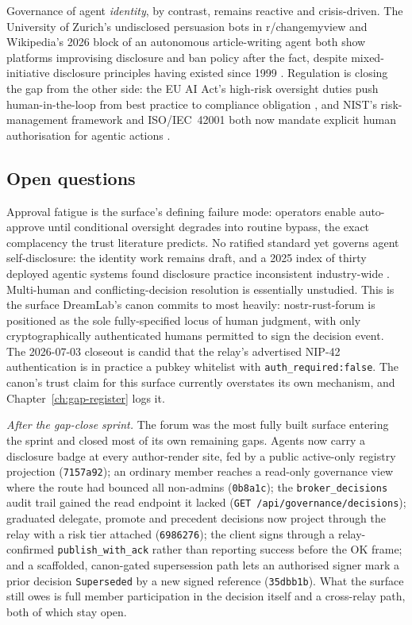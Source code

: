 Governance of agent \emph{identity}, by contrast, remains reactive and crisis-driven. The University of Zurich's undisclosed persuasion bots in r/changemyview and Wikipedia's 2026 block of an autonomous article-writing agent both show platforms improvising disclosure and ban policy after the fact, despite mixed-initiative disclosure principles having existed since 1999 \parencite{ZurichCMV2025, WikipediaAgentBan2026}. Regulation is closing the gap from the other side: the EU AI Act's high-risk oversight duties push human-in-the-loop from best practice to compliance obligation \parencite{EUAIAct2025}, and NIST's risk-management framework and ISO/IEC~42001 both now mandate explicit human authorisation for agentic actions \parencite{NISTAIRMF, ISO42001}.

\subsection{Open questions}

Approval fatigue is the surface's defining failure mode: operators enable auto-approve until conditional oversight degrades into routine bypass, the exact complacency the trust literature predicts. No ratified standard yet governs agent self-disclosure: the identity work remains draft, and a 2025 index of thirty deployed agentic systems found disclosure practice inconsistent industry-wide \parencite{AgentIndex2025}. Multi-human and conflicting-decision resolution is essentially unstudied. This is the surface DreamLab's canon commits to most heavily: nostr-rust-forum is positioned as the sole fully-specified locus of human judgment, with only cryptographically authenticated humans permitted to sign the decision event. The 2026-07-03 closeout is candid that the relay's advertised NIP-42 authentication is in practice a pubkey whitelist with \texttt{auth\_required:false}. The canon's trust claim for this surface currently overstates its own mechanism, and Chapter~\ref{ch:gap-register} logs it.

\emph{After the gap-close sprint.} The forum was the most fully built surface entering the sprint and closed most of its own remaining gaps. Agents now carry a disclosure badge at every author-render site, fed by a public active-only registry projection (\texttt{7157a92}); an ordinary member reaches a read-only governance view where the route had bounced all non-admins (\texttt{0b8a1c}); the \texttt{broker\_decisions} audit trail gained the read endpoint it lacked (\texttt{GET /api/governance/decisions}); graduated delegate, promote and precedent decisions now project through the relay with a risk tier attached (\texttt{6986276}); the client signs through a relay-confirmed \texttt{publish\_with\_ack} rather than reporting success before the OK frame; and a scaffolded, canon-gated supersession path lets an authorised signer mark a prior decision \texttt{Superseded} by a new signed reference (\texttt{35dbb1b}). What the surface still owes is full member participation in the decision itself and a cross-relay path, both of which stay open.

